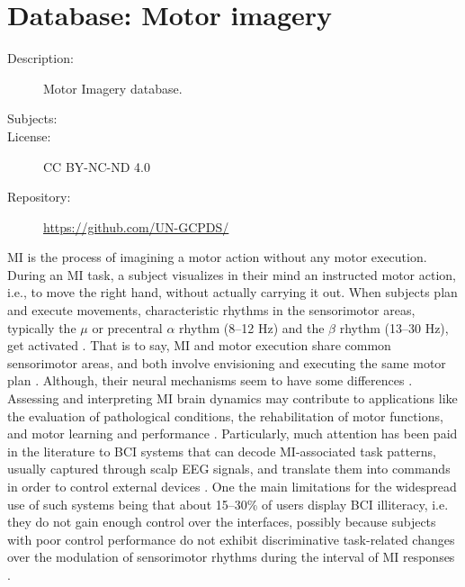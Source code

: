 \chapter{Database: Motor imagery}\label{appendix:motor-imagery}

\begin{description}
   \item[Description:]      Motor Imagery database.
   \item[Subjects:]         
   \item[License:]          CC BY-NC-ND 4.0
   \item[Repository:]       \url{https://github.com/UN-GCPDS/}
\end{description}
\hrulefill

\gls*{MI} is the process of imagining a motor action without any motor execution. During an \gls*{MI} task, a subject visualizes in their mind an instructed motor action, i.e., to move the right hand, without actually carrying it out. When subjects plan and execute movements, characteristic rhythms in the sensorimotor areas, typically the $\mu$ or precentral $\alpha$ rhythm (8–12 Hz) and the $\beta$ rhythm (13–30 Hz), get activated \cite{xu2020two}. That is to say, \gls*{MI} and motor execution share common sensorimotor areas, and both involve envisioning and executing the same motor plan \cite{garcia2021single}. Although, their neural mechanisms seem to have some differences \cite{matsuo2021comparison}. Assessing and interpreting \gls*{MI} brain dynamics may contribute to applications like the evaluation of pathological conditions, the rehabilitation of motor functions, and motor learning and performance \cite{collazos2020cnn}. Particularly, much attention has been paid in the literature to \gls*{BCI} systems that can decode \gls*{MI}-associated task patterns, usually captured through scalp EEG signals, and translate them into commands in order to control external devices \cite{galindo2020multiple, xu2020two}. One the main limitations for the widespread use of such systems being that about 15–30\% of users display \gls*{BCI} illiteracy, i.e. they do not gain enough control over the interfaces, possibly because subjects with poor control performance do not exhibit discriminative task-related changes over the modulation of sensorimotor rhythms during the interval of \gls*{MI} responses \cite{garcia2021single}.

